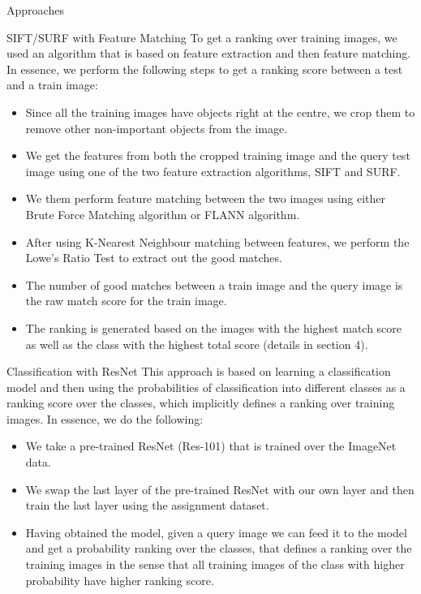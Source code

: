\documentclass{article}
\begin{document}
\begin{ssection}{Approaches}
    \begin{ssubsection}{SIFT/SURF with Feature Matching}
        To get a ranking over training images, we used an algorithm that is based on feature extraction and then feature matching. In essence, we perform the following steps to get a ranking score between a test and a train image:
        \begin{itemize}
            \item Since all the training images have objects right at the centre, we crop them to remove other non-important objects from the image.
            \item We get the features from both the cropped training image and the query test image using one of the two feature extraction algorithms, SIFT and SURF.
            \item We them perform feature matching between the two images using either Brute Force Matching algorithm or FLANN algorithm.
            \item After using K-Nearest Neighbour matching between features, we perform the Lowe's Ratio Test to extract out the good matches.
            \item The number of good matches between a train image and the query image is the raw match score for the train image.
            \item The ranking is generated based on the images with the highest match score as well as the class with the highest total score (details in section 4).
        \end{itemize}
    \end{ssubsection}
    
    \begin{ssubsection}{Classification with ResNet}
        This approach is based on learning a classification model and then using the probabilities of classification into different classes as a ranking score over the classes, which implicitly defines a ranking over training images. In essence, we do the following:
        \begin{itemize}
            \item We take a pre-trained ResNet (Res-101) that is trained over the ImageNet data.
            \item We swap the last layer of the pre-trained ResNet with our own layer and then train the last layer using the assignment dataset.
            \item Having obtained the model, given a query image we can feed it to the model and get a probability ranking over the classes, that defines a ranking over the training images in the sense that all training images of the class with higher probability have higher ranking score.
        \end{itemize}
    \end{ssubsection}
\end{ssection}
\end{document}
